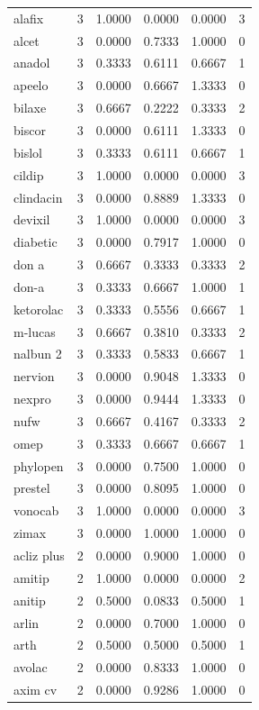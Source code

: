 \begin{longtable}{p{3.0cm}rrrrr}
alafix & 3 & 1.0000 & 0.0000 & 0.0000 & 3 \\
alcet & 3 & 0.0000 & 0.7333 & 1.0000 & 0 \\
anadol & 3 & 0.3333 & 0.6111 & 0.6667 & 1 \\
apeelo & 3 & 0.0000 & 0.6667 & 1.3333 & 0 \\
bilaxe & 3 & 0.6667 & 0.2222 & 0.3333 & 2 \\
biscor & 3 & 0.0000 & 0.6111 & 1.3333 & 0 \\
bislol & 3 & 0.3333 & 0.6111 & 0.6667 & 1 \\
cildip & 3 & 1.0000 & 0.0000 & 0.0000 & 3 \\
clindacin & 3 & 0.0000 & 0.8889 & 1.3333 & 0 \\
devixil & 3 & 1.0000 & 0.0000 & 0.0000 & 3 \\
diabetic & 3 & 0.0000 & 0.7917 & 1.0000 & 0 \\
don a & 3 & 0.6667 & 0.3333 & 0.3333 & 2 \\
don-a & 3 & 0.3333 & 0.6667 & 1.0000 & 1 \\
ketorolac & 3 & 0.3333 & 0.5556 & 0.6667 & 1 \\
m-lucas & 3 & 0.6667 & 0.3810 & 0.3333 & 2 \\
nalbun 2 & 3 & 0.3333 & 0.5833 & 0.6667 & 1 \\
nervion & 3 & 0.0000 & 0.9048 & 1.3333 & 0 \\
nexpro & 3 & 0.0000 & 0.9444 & 1.3333 & 0 \\
nufw & 3 & 0.6667 & 0.4167 & 0.3333 & 2 \\
omep & 3 & 0.3333 & 0.6667 & 0.6667 & 1 \\
phylopen & 3 & 0.0000 & 0.7500 & 1.0000 & 0 \\
prestel & 3 & 0.0000 & 0.8095 & 1.0000 & 0 \\
vonocab & 3 & 1.0000 & 0.0000 & 0.0000 & 3 \\
zimax & 3 & 0.0000 & 1.0000 & 1.0000 & 0 \\
acliz plus & 2 & 0.0000 & 0.9000 & 1.0000 & 0 \\
amitip & 2 & 1.0000 & 0.0000 & 0.0000 & 2 \\
anitip & 2 & 0.5000 & 0.0833 & 0.5000 & 1 \\
arlin & 2 & 0.0000 & 0.7000 & 1.0000 & 0 \\
arth & 2 & 0.5000 & 0.5000 & 0.5000 & 1 \\
avolac & 2 & 0.0000 & 0.8333 & 1.0000 & 0 \\
axim cv & 2 & 0.0000 & 0.9286 & 1.0000 & 0 \\

\end{longtable}

